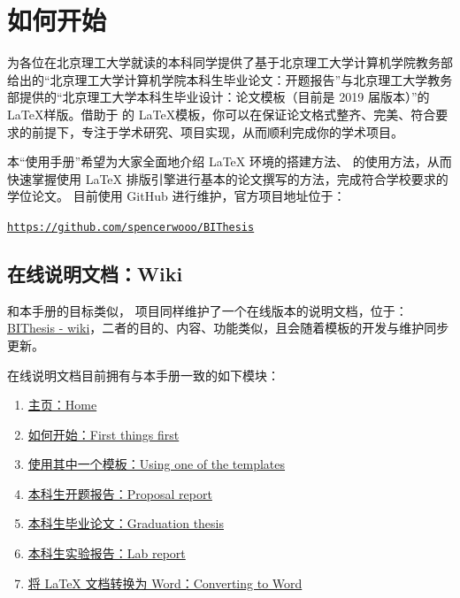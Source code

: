 \section{如何开始}
{\BIThesis} 为各位在北京理工大学就读的本科同学提供了基于北京理工大学计算机学院教务部给出的“北京理工大学计算机学院本科生毕业论文：开题报告”与北京理工大学教务部提供的“北京理工大学本科生毕业设计：论文模板（目前是 2019 届版本）”的 \LaTeX 样版。借助于 {\BIThesis} 的 \LaTeX 模板，你可以在保证论文格式整齐、完美、符合要求的前提下，专注于学术研究、项目实现，从而顺利完成你的学术项目。

本“使用手册”希望为大家全面地介绍 {\LaTeX} 环境的搭建方法、{\BIThesis} 的使用方法，从而快速掌握使用 {\LaTeX} 排版引擎进行基本的论文撰写的方法，完成符合学校要求的学位论文。{\BIThesis} 目前使用 GitHub 进行维护，官方项目地址位于：

\begin{center}
\color{ForestGreen}\href{https://github.com/spencerwooo/BIThesis}{\texttt{https://github.com/spencerwooo/BIThesis}}
\end{center}

\subsection{在线说明文档：Wiki}
和本手册的目标类似，{\BIThesis} 项目同样维护了一个在线版本的说明文档，位于：{\href{https://github.com/spencerwooo/BIThesis/wiki}{BIThesis - wiki}}，二者的目的、内容、功能类似，且会随着模板的开发与维护同步更新。

{\BIThesis} 在线说明文档目前拥有与本手册一致的如下模块：

\begin{enumerate}
\item \href{https://github.com/spencerwooo/BIThesis/wiki}{主页：Home}
\item \href{https://github.com/spencerwooo/BIThesis/wiki/First-things-first}{如何开始：First things first }
\item \href{https://github.com/spencerwooo/BIThesis/wiki/Using-one-of-the-templates}{使用其中一个模板：Using one of the templates}
\item \href{https://github.com/spencerwooo/BIThesis/wiki/Proposal-Report}{本科生开题报告：Proposal report}
\item \href{https://github.com/spencerwooo/BIThesis/wiki/Final-Graduation-Thesis}{本科生毕业论文：Graduation thesis}
\item \href{https://github.com/spencerwooo/BIThesis/wiki/Lab-Report}{本科生实验报告：Lab report}
\item \href{https://github.com/spencerwooo/BIThesis/wiki/Converting-to-Word}{将 LaTeX 文档转换为 Word：Converting to Word}
\end{enumerate}

